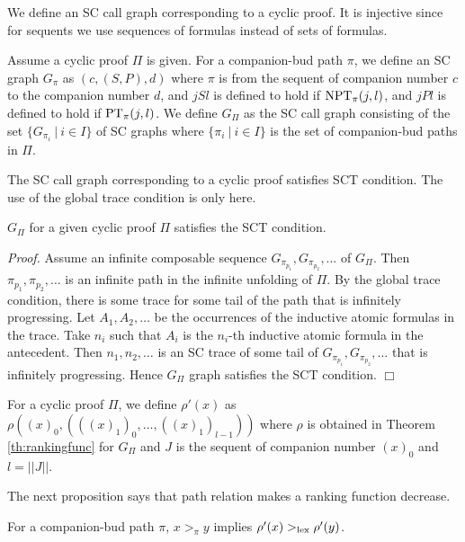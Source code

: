 We define an SC call graph corresponding to a cyclic proof.
It is injective since for sequents
we use sequences of formulas instead of sets of formulas.

\begin{Def}\rm
Assume a cyclic proof $\Pi$ is given.
%
For a companion-bud path $\pi$, 
we define an SC graph $G_{\pi}$ 
as $(c,(S,P),d)$ where
$\pi$ is from the sequent of companion number $c$ to 
the companion number $d$, and
$j S l$ is defined to hold if ${\rm NPT}_{\pi}(j,l)$, and
$j P l$ is defined to hold if ${\rm PT}_{\pi}(j,l)$.
%
We define $G_\Pi$ as
the SC call graph consisting of
the set $\{G_{\pi_i} \ |\ i \in I\}$ of SC graphs
where $\{ \pi_i \ |\ i \in I\}$ is the set of companion-bud paths in $\Pi$.

\end{Def}

The SC call graph corresponding to a cyclic proof satisfies SCT condition. 
The use of the global trace condition is only here.

\begin{Prop}\label{prop:sctcyclicproof}
$G_\Pi$ for a given cyclic proof $\Pi$ satisfies the SCT condition.
\end{Prop}

{\em Proof.}
Assume an infinite composable sequence $G_{\pi_{p_1}},G_{\pi_{p_2}},\ldots$
of $G_\Pi$.
Then $\pi_{p_1},\pi_{p_2},\ldots$ is an infinite path 
in the infinite unfolding of $\Pi$.
By the global trace condition, there is some trace for some tail of the path
that is infinitely progressing.
Let $A_1,A_2,\ldots$ be the occurrences of the inductive atomic formulas
in the trace.
Take $n_i$ such that
$A_i$ is the $n_i$-th inductive atomic formula in the antecedent.
Then $n_1,n_2,\ldots$ is an SC trace of some tail of $G_{\pi_{p_1}},G_{\pi_{p_2}},\ldots$ that is infinitely progressing.
Hence $G_\Pi$ graph satisfies the SCT condition.
$\Box$

For a cyclic proof $\Pi$,
we define $\rho'(x)$ as
$\rho((x)_0,(((x)_1)_0,\ldots,((x)_1)_{l-1}))$
where
$\rho$ is obtained in Theorem \ref{th:rankingfunc} for $G_\Pi$
and $J$ is the sequent of companion number $(x)_0$
and $l=||J||$.

The next proposition says that
path relation makes
a ranking function decrease.

\begin{Prop}\label{prop:0.5}
For a companion-bud path $\pi$,
$x >_\pi y$ implies $\rho'(x) >_{\rm lex} \rho'(y)$.
\end{Prop}


